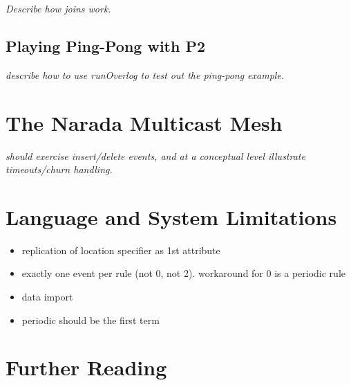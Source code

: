 \documentclass{article}
\begin{document}
{\em Describe how joins work.}



\subsection{Playing Ping-Pong with P2}
{\em describe how to use runOverlog to test out the ping-pong
example.}

\section{The Narada Multicast Mesh}
{\em should exercise insert/delete events, and at a conceptual level
illustrate timeouts/churn handling.}

\section{Language and System Limitations}
\begin{itemize}
\item replication of location specifier as 1st attribute
\item exactly one event per rule (not 0, not 2).  workaround for 0 is
      a periodic rule
\item data import
\item periodic should be the first term
\end{itemize}
\section{Further Reading}
\end{document}
